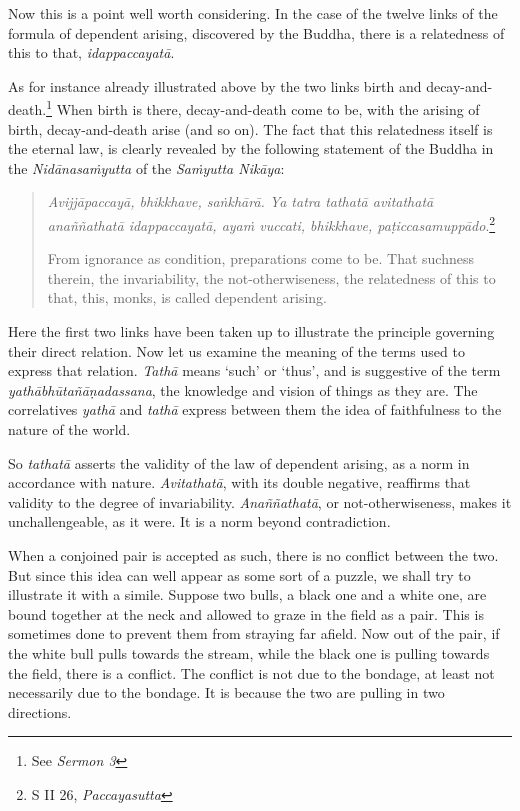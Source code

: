 Now this is a point well worth considering. In the case of the twelve links of the formula of dependent arising, discovered by the Buddha, there is a relatedness of this to that, \emph{idappaccayatā}.

As for instance already illustrated above by the two links birth and decay-and-death.\footnote{See \emph{Sermon 3}} When birth is there, decay-and-death come to be, with the arising of birth, decay-and-death arise (and so on). The fact that this relatedness itself is the eternal law, is clearly revealed by the following statement of the Buddha in the \emph{Nidānasaṁyutta} of the \emph{Saṁyutta Nikāya}:

\begin{quote}
\emph{Avijjāpaccayā, bhikkhave, saṅkhārā. Ya tatra tathatā avitathatā anaññathatā idappaccayatā, ayaṁ vuccati, bhikkhave, paṭiccasamuppādo}.\footnote{S II 26, \emph{Paccayasutta}}

From ignorance as condition, preparations come to be. That suchness therein, the invariability, the not-otherwiseness, the relatedness of this to that, this, monks, is called dependent arising.
\end{quote}

Here the first two links have been taken up to illustrate the principle governing their direct relation. Now let us examine the meaning of the terms used to express that relation. \emph{Tathā} means `such' or `thus', and is suggestive of the term \emph{yathābhūtañāṇadassana}, the knowledge and vision of things as they are. The correlatives \emph{yathā} and \emph{tathā} express between them the idea of faithfulness to the nature of the world.

So \emph{tathatā} asserts the validity of the law of dependent arising, as a norm in accordance with nature. \emph{Avitathatā}, with its double negative, reaffirms that validity to the degree of invariability. \emph{Anaññathatā}, or not-otherwiseness, makes it unchallengeable, as it were. It is a norm beyond contradiction.

When a conjoined pair is accepted as such, there is no conflict between the two. But since this idea can well appear as some sort of a puzzle, we shall try to illustrate it with a simile. Suppose two bulls, a black one and a white one, are bound together at the neck and allowed to graze in the field as a pair. This is sometimes done to prevent them from straying far afield. Now out of the pair, if the white bull pulls towards the stream, while the black one is pulling towards the field, there is a conflict. The conflict is not due to the bondage, at least not necessarily due to the bondage. It is because the two are pulling in two directions.

